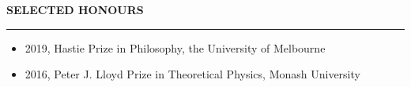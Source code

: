 \documentclass[10pt]{article}
\begin{document}
\vspace{1cm}
\begin{large}
{\bf SELECTED HONOURS} \\
\textcolor{gray}{\rule{2cm}{2mm}}
\end{large}
\begin{small}
\begin{itemize}
\item 2019, Hastie Prize in Philosophy, the University of Melbourne
\item 2016, Peter J. Lloyd Prize in Theoretical Physics, Monash University
\end{itemize}
\end{small}
\end{document}
